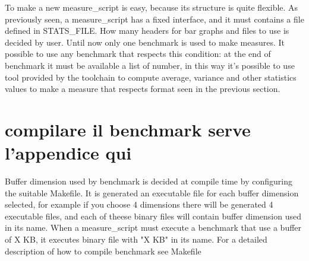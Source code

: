 \documentclass[a4paper,10pt]{article}
\begin{document}
\begin{multicols}{2}
\begin{enumerate}
To make a new measure\_script is easy, because its structure is quite flexible. As previously seen, a measure\_script has a fixed 
interface, and it must contains a file defined in STATS\_FILE. How many headers for bar graphs and files to use is decided by user.
Until now only one benchmark is used to make measures. It possible to use any benchmark that respects this condition: at the end of benchmark
it must be available a list of number, in this way it's possible to use tool provided by the toolchain to compute average, variance
and other statistics values to make a measure that respects format seen in the previous section.

\end{enumerate}

\section{compilare il benchmark serve l'appendice qui}

Buffer dimension used by benchmark is decided at compile time by configuring the suitable Makefile.
It is generated an executable file for each buffer dimension selected, for example if you choose 4 
dimensions there will be generated 4 executable files, and each of theese binary files will contain
buffer dimension used in its name. When a measure\_script must execute a benchmark that use a buffer of X KB, it executes binary file 
with "X KB" in its name.
For a detailed description of how to compile benchmark see Makefile





\end{multicols}
\end{document}
